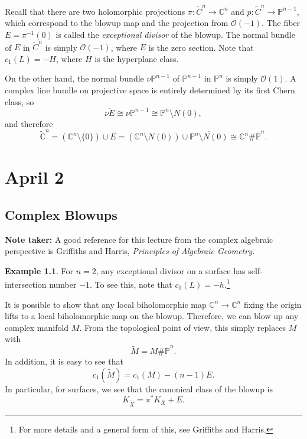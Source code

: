 \documentclass[leqno, openany]{memoir}
\theoremstyle{definition}
\newtheorem{exm}[thm]{Example}
\theoremstyle{remark}
\theoremstyle{plain}
\theoremstyle{definition}
\theoremstyle{remark}
\newcommand{\C}{\mathbb{C}}
\renewcommand{\P}{\mathbb{P}}
\newcommand{\mc}[1]{\mathcal{#1}}
\begin{document}
    Recall that there are two holomorphic projections $\pi: \widetilde{C}^n \to \C^n$ and $p: \widetilde{C}^n \to \P^{n-1}$, which correspond to the blowup map and the projection from $\mc{O}(-1)$. The fiber $E = \pi^{-1}(0)$ is called the \textit{exceptional divisor} of the blowup. The normal bundle of $E$ in $\widetilde{C}^n$ is simply $\mc{O}(-1)$, where $E$ is the zero section. Note that $c_1(L) = -H$, where $H$ is the hyperplane class. 

    On the other hand, the normal bundle $\nu \P^{n-1}$ of $\P^{n-1}$ in $\P^n$ is simply $\mc{O}(1)$. A complex line bundle on projective space is entirely determined by its first Chern class, so 
    \[ \overline{\nu E} \cong \nu \P^{n-1} \cong \P^n \setminus N(0), \]
    and therefore
    \[ \widetilde{\C}^n = (\C^n \setminus \{0\} ) \cup E = (\C^n \setminus N(0)) \cup \overline{\P^n \setminus N(0)} \cong \C^n \# \overline{\P}^n. \]

    \chapter{April 2}%
    \label{cha:april_2}

    \section{Complex Blowups}%
    \label{sec:complex_blowups}

    \textbf{Note taker:} A good reference for this lecture from the complex algebraic perspective is Griffiths and Harris, \textit{Principles of Algebraic Geometry.}

    \begin{exm}
        For $n = 2$, any exceptional divisor on a surface has self-intersection number $-1$. To see this, note that $c_1(L) = -h$.\footnote{For more details and a general form of this, see Griffiths and Harris.}
    \end{exm}

    It is possible to show that any local biholomorphic map $\C^n \to \C^n$ fixing the origin lifts to a local biholomorphic map on the blowup. Therefore, we can blow up any complex manifold $M$. From the topological point of view, this simply replaces $M$ with 
    \[ \widetilde{M} = M \# \overline{\P}^{n}. \] 
    In addition, it is easy to see that
    \[ c_1(\widetilde{M}) = c_1(M) - (n-1) E. \]
    In particular, for surfaces, we see that the canonical class of the blowup is
    \[ K_{\widetilde{X}} = \pi^* K_X + E. \]
\end{document}
